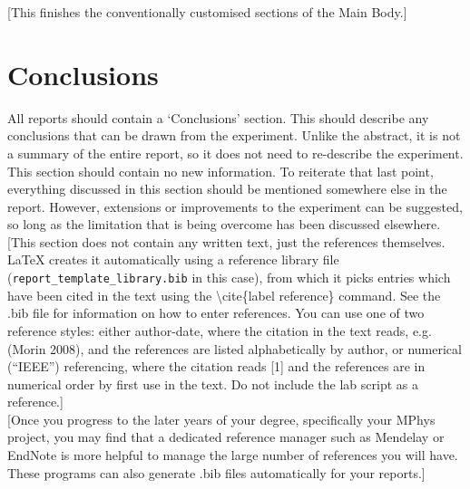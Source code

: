 \documentclass[11pt]{article} %
\begin{document}
{\color{blue}[This finishes the conventionally customised sections of the Main Body.]}\\

\section{Conclusions}
All reports should contain a `Conclusions' section. This should describe any conclusions that can be drawn from the experiment.
Unlike the abstract, it is not a summary of the entire report, so it does not need to re-describe the experiment. This section should contain no new information. To reiterate that last point, everything discussed in this section should be mentioned somewhere else in the report. However, extensions or improvements to the experiment can be suggested, so long as the limitation that is being overcome has been discussed elsewhere.\\



{\color{blue} [This section does not contain any written text, just the references themselves.  LaTeX creates it
automatically using a reference library file ({\tt report\_template\_library.bib} in this case), from which it picks entries which have
been cited in the text using the \textbackslash cite\{label reference\} command. See the .bib file for information on how to enter references. You can use one of two reference styles: either author-date, where the citation in the text reads, e.g. (Morin 2008), 
and the references are listed alphabetically by author, or numerical (“IEEE”) referencing, where the citation reads [1] and the references are in numerical order by first use in the text. Do not include the lab script as a reference.]\\

 [Once you progress to the later years of your degree, specifically your MPhys project, you may find that a dedicated reference manager such as Mendelay or EndNote is more helpful to manage the large number of references you will have. These programs can also generate .bib files automatically for your reports.]}\\
\end{document}
